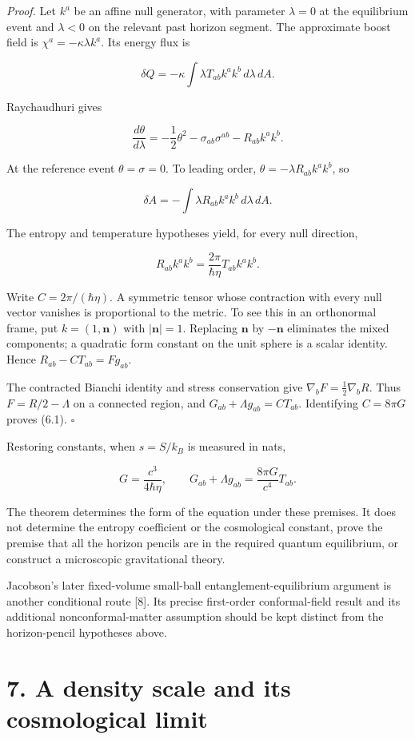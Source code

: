 \documentclass[
  11pt,
  a4paper,
]{article}
\begin{document}
\emph{Proof.} Let \(k^a\) be an affine null generator, with parameter \(\lambda=0\) at the equilibrium event and \(\lambda<0\) on the relevant past horizon segment. The approximate boost field is \(\chi^a=-\kappa\lambda k^a\). Its energy flux is

\[
\delta Q=-\kappa\int\lambda T_{ab}k^ak^b\,d\lambda\,dA.
\]

Raychaudhuri gives

\[
\frac{d\theta}{d\lambda}
=-\frac12\theta^2-\sigma_{ab}\sigma^{ab}-R_{ab}k^ak^b.
\]

At the reference event \(\theta=\sigma=0\). To leading order, \(\theta=-\lambda R_{ab}k^ak^b\), so

\[
\delta A=-\int\lambda R_{ab}k^ak^b\,d\lambda\,dA.
\]

The entropy and temperature hypotheses yield, for every null direction,

\[
R_{ab}k^ak^b=\frac{2\pi}{\hbar\eta}T_{ab}k^ak^b.
\]

Write \(C=2\pi/(\hbar\eta)\). A symmetric tensor whose contraction with every null vector vanishes is proportional to the metric. To see this in an orthonormal frame, put \(k=(1,\mathbf n)\) with \(|\mathbf n|=1\). Replacing \(\mathbf n\) by \(-\mathbf n\) eliminates the mixed components; a quadratic form constant on the unit sphere is a scalar identity. Hence \(R_{ab}-CT_{ab}=F g_{ab}\).

The contracted Bianchi identity and stress conservation give \(\nabla_bF=\frac12\nabla_bR\). Thus \(F=R/2-\Lambda\) on a connected region, and \(G_{ab}+\Lambda g_{ab}=CT_{ab}\). Identifying \(C=8\pi G\) proves (6.1). \(\square\)

Restoring constants, when \(s=S/k_B\) is measured in nats,

\[
G=\frac{c^3}{4\hbar\eta},\qquad
G_{ab}+\Lambda g_{ab}=\frac{8\pi G}{c^4}T_{ab}.
\]

The theorem determines the form of the equation under these premises. It does not determine the entropy coefficient or the cosmological constant, prove the premise that all the horizon pencils are in the required quantum equilibrium, or construct a microscopic gravitational theory.

Jacobson's later fixed-volume small-ball entanglement-equilibrium argument is another conditional route {[}8{]}. Its precise first-order conformal-field result and its additional nonconformal-matter assumption should be kept distinct from the horizon-pencil hypotheses above.

\section{7. A density scale and its cosmological limit}\label{a-density-scale-and-its-cosmological-limit}
\end{document}
